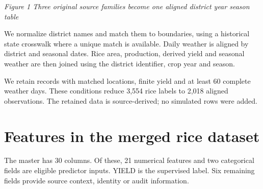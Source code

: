 \documentclass[11pt,a4paper]{article}
\begin{document}
\begin{center}\end{center}
{\footnotesize\itshape Figure 1  Three original source families become one aligned district year season table}\par
We normalize district names and match them to boundaries, using a historical state crosswalk where a unique match is available. Daily weather is aligned by district and seasonal dates. Rice area, production, derived yield and seasonal weather are then joined using the district identifier, crop year and season.

We retain records with matched locations, finite yield and at least 60 complete weather days. These conditions reduce 3,554 rice labels to 2,018 aligned observations. The retained data is source-derived; no simulated rows were added.

\clearpage\section*{Features in the merged rice dataset}
The master has 30 columns. Of these, 21 numerical features and two categorical fields are eligible predictor inputs. YIELD is the supervised label. Six remaining fields provide source context, identity or audit information.
\end{document}
